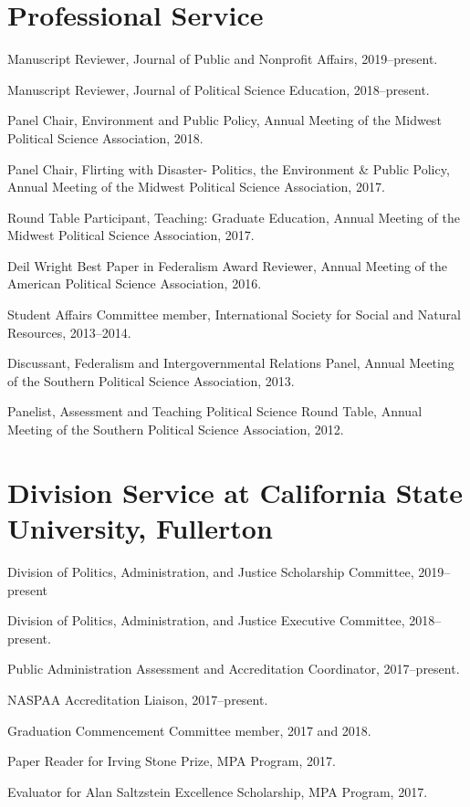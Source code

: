 \documentclass[11pt,letterpaper]{article}
\renewenvironment{itemize}{
  \begin{list}{}{
    \setlength{\leftmargin}{1.5em}
    \setlength{\itemsep}{0.25em}
    \setlength{\parskip}{0pt}
    \setlength{\parsep}{0.25em}
  }
}{
  \end{list}
}
\begin{document}
\section*{Professional Service}
\begin{itemize}\leftmargin=2pt\itemindent=-15pt
	\item Manuscript Reviewer, Journal of Public and Nonprofit Affairs, 2019--present.
	\item Manuscript Reviewer, Journal of Political Science Education, 2018--present.
	\item Panel Chair, Environment and Public Policy, Annual Meeting of the Midwest Political Science Association, 2018.
	\item Panel Chair, Flirting with Disaster- Politics, the Environment \& Public Policy, Annual Meeting of the Midwest Political Science Association, 2017. 
	\item Round Table Participant, Teaching: Graduate Education, Annual Meeting of the Midwest Political Science Association, 2017.
	\item Deil Wright Best Paper in Federalism Award Reviewer, Annual Meeting of the American Political Science Association, 2016.
	\item Student Affairs Committee member, International Society for Social and Natural Resources, 2013--2014.
	\item Discussant, Federalism and Intergovernmental Relations Panel, Annual Meeting of the Southern Political Science Association, 2013.
	\item Panelist, Assessment and Teaching Political Science Round Table, Annual Meeting of the Southern Political Science Association, 2012.
\end{itemize}

\section*{Division Service at California State University, Fullerton}
	\begin{itemize}
		\item Division of Politics, Administration, and Justice Scholarship Committee, 2019--present
		\item Division of Politics, Administration, and Justice Executive Committee, 2018--present. 
		\item Public Administration Assessment and Accreditation Coordinator, 2017--present.
		\item NASPAA Accreditation Liaison, 2017--present.
		\item Graduation Commencement Committee member, 2017 and 2018.
		\item Paper Reader for Irving Stone Prize, MPA Program, 2017.
		\item Evaluator for Alan Saltzstein Excellence Scholarship, MPA Program, 2017. 
	\end{itemize}
\end{document}
